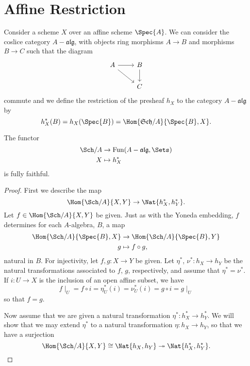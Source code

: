 \documentclass[10pt]{amsart}
\begin{document}
\section{Affine Restriction}
Consider a scheme $X$ over an affine scheme $\Spec{A}$.
We can consider the coslice category $A-\mathfrak{alg}$, with objects ring morphisms $A \rightarrow B$ and morphisms $B \rightarrow C$ such that the diagram
$$\begin{tikzcd}
  A\arrow{r}\arrow{rd} & B\arrow{d}\\
  & C
\end{tikzcd}$$
commute and we define the restriction of the presheaf $h_X$ to the category $A-\mathfrak{alg}$ by
$$h_X^*(B) =  h_X(\Spec{B}) = \Hom{\mathfrak{Sch}/A}{\Spec{B}, X}.$$

\begin{prop}
  The functor
  \begin{align*}
    \Sch/A &\rightarrow \operatorname{Fun}({A-\mathfrak{alg}}, \Sets)\\
    X &\mapsto h_X^*
  \end{align*}
  is fully faithful.
  \begin{proof}
    First we describe the map
    $$\Hom{\Sch/A}{X,Y} \rightarrow \Nat{h_X^*, h_Y^*}.$$
    Let $f \in \Hom{\Sch/A}{X,Y}$ be given.
    Just as with the Yoneda embedding, $f$ determines for each $A$-algebra, $B$, a map
    \begin{align*}
      \Hom{\Sch/A}{\Spec{B},X} &\rightarrow \Hom{\Sch/A}{\Spec{B},Y}\\
      g &\mapsto f \circ g,
    \end{align*}
    natural in $B$.
    For injectivity, let $f,g : X \rightarrow Y$ be given.
    Let $\eta^*$, $\nu^* : h_X \rightarrow h_Y$ be the natural transformations associated to $f$, $g$, respectively, and assume that $\eta^* = \nu^*$.
    If $i : U \rightarrow X$ is the inclusion of an open affine subset, we have
    $$f\mid_U = f \circ i = \eta^*_U(i) = \nu^*_U(i) = g \circ i = g\mid_U$$
    so that $f = g$.
    
    Now assume that we are given a natural transformation $\eta^* \colon h_X^* \rightarrow h_Y^*$.
    We will show that we may extend $\eta^*$ to a natural transformation $\eta : h_X \rightarrow h_Y$, so that we have a surjection
    $$\Hom{\Sch/A}{X,Y} \cong \Nat{h_X, h_Y} \twoheadrightarrow \Nat{h_X^*, h_Y^*}.$$


\end{proof}
\end{prop}
\end{document}
